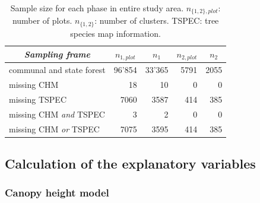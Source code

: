 \begin{table}[H]
	\begin{center}
		\caption{Sample size for each phase in entire study area. $n_{\{1,2\},plot}$: number of plots. $n_{\{1,2\}}$: number of clusters. TSPEC: tree species map information.}
		\vspace{0.2cm}
		\label{tab:ssize}
		{\small %
			\begin{tabular}{l|r|r|r|r}
				\hline
				\multicolumn{1}{c|}{\textit{Sampling frame}} & \multicolumn{1}{c|}{\textbf{$n_{1,plot}$}}  & \multicolumn{1}{c|}{\textbf{$n_1$}}  & \multicolumn{1}{c|}{\textbf{$n_{2,plot}$}}  & \multicolumn{1}{c}{\textbf{$n_2$}} \\ %
				\hline \hline
				communal and state forest & 96'854 & 33'365 & 5791 & 2055\\
				\hspace{5mm} \footnotesize missing CHM & \footnotesize 18 & \footnotesize 10 & \footnotesize 0 & \footnotesize 0\\ %
				\hspace{5mm} \footnotesize missing TSPEC & \footnotesize 7060  & \footnotesize 3587 & \footnotesize 414 & \footnotesize 385\\ %
				\hspace{5mm} \footnotesize missing CHM \textit{and} TSPEC & \footnotesize 3 & \footnotesize 2 & \footnotesize 0 & \footnotesize 0\\ %
				\hspace{5mm} \footnotesize missing CHM \textit{or} TSPEC & \footnotesize 7075 & \footnotesize 3595 & \footnotesize 414 & \footnotesize 385\\ %
				\hline \hline
			\end{tabular}
		} %
	\end{center}
\end{table}


\subsection{Calculation of the explanatory variables}
\label{sec:expvarcalc}

\subsubsection{Canopy height model}

